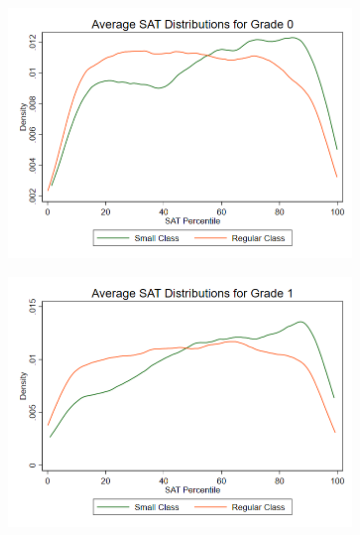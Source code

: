 \documentclass[a4paper,11pt]{article}
\begin{document}
\begin{figure}[H]
\begin{subfigure}{0.5\textwidth}
	\includegraphics[width=\linewidth]{figure1_0.png}
\end{subfigure}
\begin{subfigure}{0.5\textwidth}
	\includegraphics[width=\linewidth]{figure1_1.png}
\end{subfigure}
\end{figure}
\end{document}
